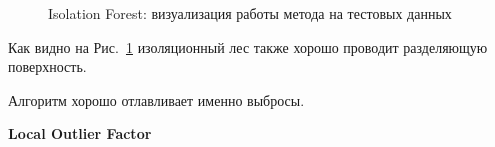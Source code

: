\documentclass[12pt]{article}
\begin{document}
    \begin{figure}[h!]
        \centering
        \caption{Isolation Forest: визуализация работы метода на тестовых данных}
        \label{sec:Research:Model:Visualization:fig:IsolationForest}
    \end{figure}

    \par Как видно на Рис.~\ref{sec:Research:Model:Visualization:fig:IsolationForest} изоляционный лес также хорошо проводит разделяющую поверхность.
    \par Алгоритм хорошо отлавливает именно выбросы.

    \newpage


    \textbf{Local Outlier Factor} \\
\end{document}
